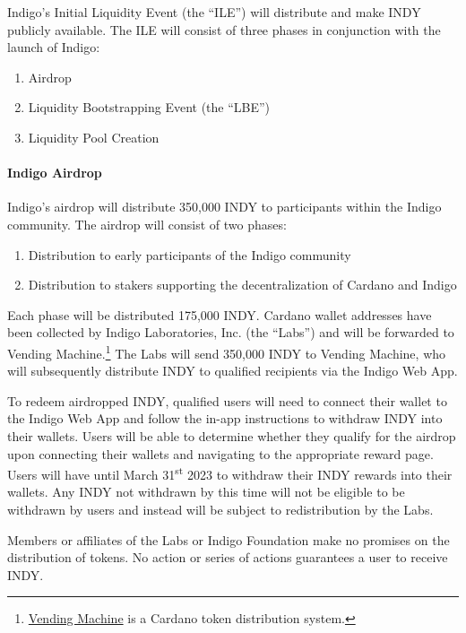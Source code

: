 \documentclass{article}
\begin{document}
\begin{sloppypar}
Indigo's Initial Liquidity Event (the ``ILE'') will distribute and make
INDY publicly available. The ILE will consist of three phases in
conjunction with the launch of Indigo:

\begin{enumerate}
\item
  Airdrop
\item
  Liquidity Bootstrapping Event (the ``LBE'')
\item
  Liquidity Pool Creation
\end{enumerate}

\hypertarget{indigo-airdrop}{%
\paragraph{Indigo Airdrop}\label{indigo-airdrop}}

Indigo's airdrop will distribute 350,000 INDY to participants within the
Indigo community. The airdrop will consist of two phases:

\begin{enumerate}
\item
  Distribution to early participants of the Indigo community
\item
  Distribution to stakers supporting the decentralization of Cardano and
  Indigo
\end{enumerate}

Each phase will be distributed 175,000 INDY. Cardano wallet addresses
have been collected by Indigo Laboratories, Inc. (the ``Labs'') and will
be forwarded to Vending Machine.\footnote{\href{https://vm.adaseal.eu/about}{Vending
  Machine} is a Cardano token distribution system.} The Labs will send
350,000 INDY to Vending Machine, who will subsequently distribute INDY
to qualified recipients via the Indigo Web App.

To redeem airdropped INDY, qualified users will need to connect their
wallet to the Indigo Web App and follow the in-app instructions to
withdraw INDY into their wallets. Users will be able to determine
whether they qualify for the airdrop upon connecting their wallets and
navigating to the appropriate reward page. Users will have until March
31\textsuperscript{st} 2023 to withdraw their INDY rewards into their
wallets. Any INDY not withdrawn by this time will not be eligible to be
withdrawn by users and instead will be subject to redistribution by the
Labs.

Members or affiliates of the Labs or Indigo Foundation make no promises
on the distribution of tokens. No action or series of actions guarantees
a user to receive INDY.


\end{sloppypar}
\end{document}

